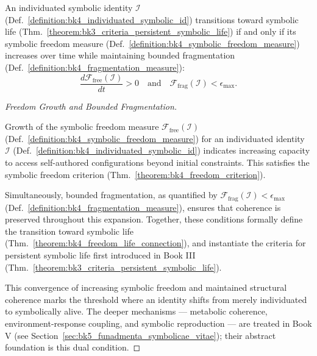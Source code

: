 \begin{theorem} 
\label{theorem:bk4_freedom_life_connection}
An individuated symbolic identity $\mathcal{I}$ (Def.~\ref{definition:bk4_individuated_symbolic_id}) transitions toward symbolic life (Thm.~\ref{theorem:bk3_criteria_persistent_symbolic_life}) if and only if its symbolic freedom measure (Def.~\ref{definition:bk4_symbolic_freedom_measure}) increases over time while maintaining bounded fragmentation (Def.~\ref{definition:bk4_fragmentation_measure}):
\begin{equation}
    \frac{d\mathcal{F}_{\text{free}}(\mathcal{I})}{dt} > 0 
    \quad \text{and} \quad 
    \mathcal{F}_{\text{frag}}(\mathcal{I}) < \epsilon_{\text{max}}.
\end{equation}
\end{theorem}

\begin{proof}[Freedom Growth and Bounded Fragmentation]
\label{proof:bk4_freedom_growth_fragmentation}
\leavevmode

Growth of the symbolic freedom measure
$\mathcal{F}_{\text{free}}(\mathcal{I})$
(Def.~\ref{definition:bk4_symbolic_freedom_measure}) for an individuated
identity $\mathcal{I}$ (Def.~\ref{definition:bk4_individuated_symbolic_id})
indicates increasing capacity to access self-authored configurations beyond
initial constraints. This satisfies the symbolic freedom criterion
(Thm.~\ref{theorem:bk4_freedom_criterion}).

Simultaneously, bounded fragmentation, as quantified by $\mathcal{F}_{\text{frag}}(\mathcal{I}) < \epsilon_{\text{max}}$ (Def.~\ref{definition:bk4_fragmentation_measure}), ensures that coherence is preserved throughout this expansion. Together, these conditions formally define the transition toward symbolic life (Thm.~\ref{theorem:bk4_freedom_life_connection}), and instantiate the criteria for persistent symbolic life first introduced in Book III (Thm.~\ref{theorem:bk3_criteria_persistent_symbolic_life}).

This convergence of increasing symbolic freedom and maintained structural coherence marks the threshold where an identity shifts from merely individuated to symbolically alive.
The deeper mechanisms --- metabolic coherence, environment-response coupling, and symbolic reproduction --- are treated in Book V (see Section~\ref{sec:bk5_funadmenta_symbolicae_vitae}); their abstract foundation is this dual condition.
\end{proof}

